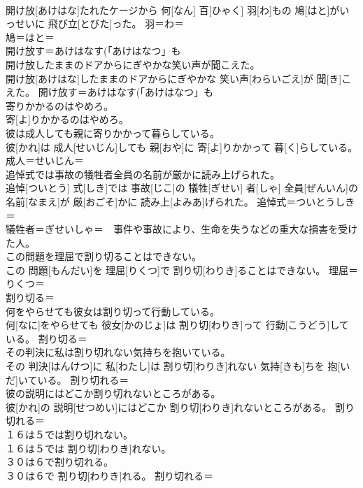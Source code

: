 \documentclass[8pt]{extreport}
\begin{document}
\begin{CJK}{UTF8}{min}
\\	開け放[あけはな]たれたケージから 何[なん] 百[ひゃく] 羽[わ]もの 鳩[はと]がいっせいに 飛び立[とびた]った。	羽＝わ＝ 
\\	鳩＝はと＝ 
\\	開け放す＝あけはなす(「あけはなつ」も 
\\	開け放したままのドアからにぎやかな笑い声が聞こえた。	
\\	開け放[あけはな]したままのドアからにぎやかな 笑い声[わらいごえ]が 聞[き]こえた。	開け放す＝あけはなす(「あけはなつ」も 
\\	寄りかかるのはやめろ。	
\\	寄[よ]りかかるのはやめろ。	
\\	彼は成人しても親に寄りかかって暮らしている。	
\\	彼[かれ]は 成人[せいじん]しても 親[おや]に 寄[よ]りかかって 暮[く]らしている。	成人＝せいじん＝ 
\\	追悼式では事故の犠牲者全員の名前が厳かに読み上げられた。	
\\	追悼[ついとう] 式[しき]では 事故[じこ]の 犠牲[ぎせい] 者[しゃ] 全員[ぜんいん]の 名前[なまえ]が 厳[おごそ]かに 読み上[よみあ]げられた。	追悼式＝ついとうしき＝ 
\\	犠牲者＝ぎせいしゃ＝　事件や事故により、生命を失うなどの重大な損害を受けた人。
\\	この問題を理屈で割り切ることはできない。	
\\	この 問題[もんだい]を 理屈[りくつ]で 割り切[わりき]ることはできない。	理屈＝りくつ＝ 
\\	割り切る＝ 
\\	何をやらせても彼女は割り切って行動している。	
\\	何[なに]をやらせても 彼女[かのじょ]は 割り切[わりき]って 行動[こうどう]している。	割り切る＝ 
\\	その判決に私は割り切れない気持ちを抱いている。	
\\	その 判決[はんけつ]に 私[わたし]は 割り切[わりき]れない 気持[きも]ちを 抱[いだ]いている。	割り切れる＝ 
\\	彼の説明にはどこか割り切れないところがある。	
\\	彼[かれ]の 説明[せつめい]にはどこか 割り切[わりき]れないところがある。	割り切れる＝ 
\\	１６は５では割り切れない。	
\\	１６は５では 割り切[わりき]れない。	
\\	３０は６で割り切れる。	
\\	３０は６で 割り切[わりき]れる。	割り切れる＝ 

\end{CJK}
\end{document}
